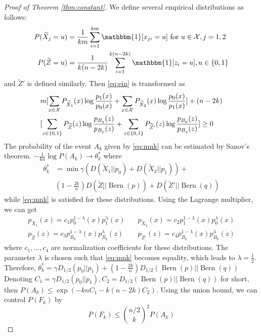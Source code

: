 \documentclass[conference]{IEEEtran}
\DeclareMathOperator{\Bern}{Bern}
\begin{document}
\begin{proof}[Proof of Theorem \ref{thm:constant}]
We define several empirical distributions as follows: 
\begin{align*}
P(\widetilde{X}_j = u) &= \frac{1}{km} \sum_{i=1}^{km} \mathbbm{1}[x_{ji} = u] \textrm{ for } u \in \mathcal{X}, j=1,2 \\
P(\widetilde{Z} = u) &= \frac{1}{k(n-2k)}\sum_{i=1}^{k(n-2k)} \mathbbm{1}[z_i = u], u \in \{0, 1\}
\end{align*}
and $\widetilde{Z}'$ is defined similarly. Then
\eqref{eq:ein} is transformed as
\begin{align}
&m[\sum_{x\in \mathcal{X}}P_{\widetilde{X}_1}(x)\log\frac{p_1(x)}{p_0(x)}
+\sum_{x\in \mathcal{X}}P_{\widetilde{X}_2}(x)\log\frac{p_0(x)}{p_1(x)}] +(n-2k)\notag \\
&[\sum_{z\in\{0,1\}} P_{\widetilde{Z}}(z) \log \frac{p_{B_q}(z)}{p_{B_p}(z)}
+ \sum_{z\in\{0,1\}} P_{\widetilde{Z}'}(z) \log \frac{p_{B_p}(z)}{p_{B_q}(z)}] \geq 0 \label{eq:mnk}
\end{align}
The probability of the event $A_k$ given by \eqref{eq:mnk} can be estimated by Sanov's theorem.
$-\frac{1}{kn}\log P(A_k) \to \theta^*_k$ where 
\begin{align*}
\theta^*_k &= \min \gamma (D(\widetilde{X}_1||p_0) + D(\widetilde{X}_2||p_1)) + \\
&(1-\frac{2k}{n})D(\widetilde{Z}||\Bern(p)) + D(\widetilde{Z}'||\Bern(q)) 
\end{align*}
while \eqref{eq:mnk} is satisfied for these distributions. Using the Lagrange multiplier, we can get
\begin{align*}
p_{\widetilde{X}_1}(x) = c_1 p_0^{1-\lambda}(x)p_1^{\lambda}(x)\quad & p_{\widetilde{X}_2}(x) = c_2 p_1^{1-\lambda}(x)p_0^{\lambda}(x) \\
p_{\widetilde{Z}}(z) = c_3 p_{B_p}^{1-\lambda}(x)p_{B_q}^{\lambda}(z)\quad &
p_{\widetilde{Z}'}(z) = c_4 p_{B_q}^{1-\lambda}(x)p_{B_p}^{\lambda}(z)
\end{align*}
where $c_1, \dots, c_4$ are normalization coefficients for these distributions.
The parameter $\lambda$ is chosen such that \eqref{eq:mnk} becomes equality, which leads to $\lambda=\frac{1}{2}$.
Therefore, $\theta^*_k = \gamma D_{1/2}(p_0 || p_1) +(1-\frac{2k}{n}) D_{1/2}(\Bern(p)||\Bern(q))$
Denoting $C_1=\gamma D_{1/2}(p_0 || p_1), C_2=D_{1/2}(\Bern(p)||\Bern(q))$ for short,
then $
P(A_k) \leq \exp(-knC_1-k(n-2k) C_2)
$. Using the union bound, we can control $P(F_k)$ by
\begin{equation}\label{eq:FAk}
P(F_k) \leq \binom{n/2}{k}^2 P(A_k)
\end{equation}

\end{proof}
\end{document}

